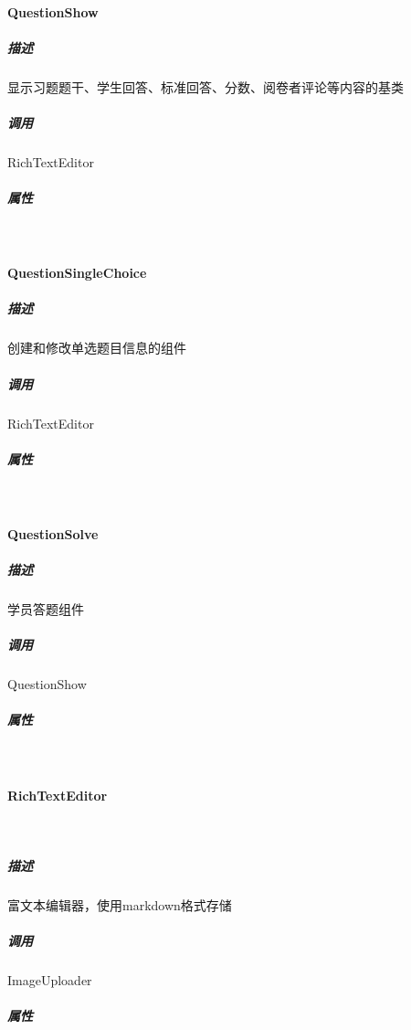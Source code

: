 \documentclass{article}
\begin{document}
    	\paragraph{QuestionShow}
    		\subparagraph{描述}
                显示习题题干、学生回答、标准回答、分数、阅卷者评论等内容的基类
            \subparagraph{调用} RichTextEditor
    		\subparagraph{属性} \ \par
       
       \paragraph{QuestionSingleChoice}
            \subparagraph{描述}
                创建和修改单选题目信息的组件
            \subparagraph{调用} RichTextEditor
            \subparagraph{属性} \ \par
                 \par
                 \par
                \par
        \paragraph{QuestionSolve}
            \subparagraph{描述}
                学员答题组件
            \subparagraph{调用}
                QuestionShow
            \subparagraph{属性} \ \par
                \par
                \par
                \par
       
       \paragraph{RichTextEditor} \ \par
            \subparagraph{描述}
                富文本编辑器，使用markdown格式存储
            \subparagraph{调用} ImageUploader
            \subparagraph{属性} \ \par
                \par
                \par
                \par
                 \par
                
\end{document}
